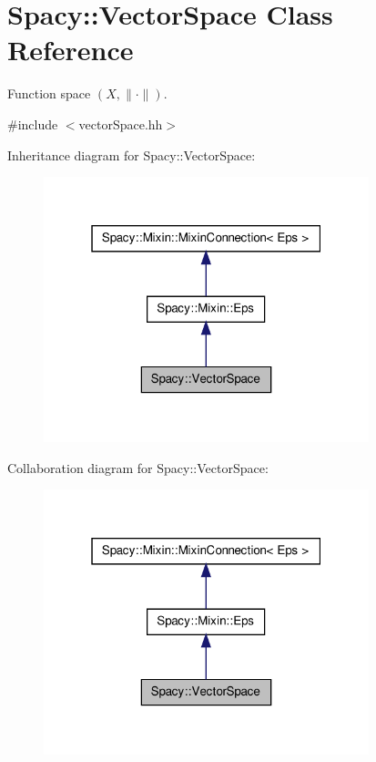 \hypertarget{classSpacy_1_1VectorSpace}{\section{\-Spacy\-:\-:\-Vector\-Space \-Class \-Reference}
\label{classSpacy_1_1VectorSpace}
}


\-Function space $(X,\|\cdot\|)$.  




{\ttfamily \#include $<$vector\-Space.\-hh$>$}



\-Inheritance diagram for \-Spacy\-:\-:\-Vector\-Space\-:
\nopagebreak
\begin{figure}[H]
\begin{center}
\leavevmode
\includegraphics[width=268pt]{classSpacy_1_1VectorSpace__inherit__graph}
\end{center}
\end{figure}


\-Collaboration diagram for \-Spacy\-:\-:\-Vector\-Space\-:
\nopagebreak
\begin{figure}[H]
\begin{center}
\leavevmode
\includegraphics[width=268pt]{classSpacy_1_1VectorSpace__coll__graph}
\end{center}
\end{figure}
